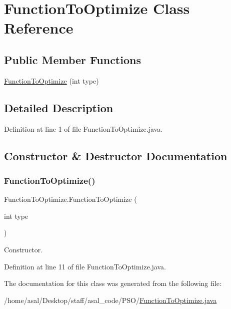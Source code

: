 \hypertarget{class_function_to_optimize}{}\section{Function\+To\+Optimize Class Reference}
\label{class_function_to_optimize}
\subsection*{Public Member Functions}
\begin{DoxyCompactItemize}
\item 
\hyperlink{class_function_to_optimize_ac98c69a430ad4270a84a9f17e48aaf0e}{Function\+To\+Optimize} (int type)
\end{DoxyCompactItemize}


\subsection{Detailed Description}


Definition at line 1 of file Function\+To\+Optimize.\+java.



\subsection{Constructor \& Destructor Documentation}
\mbox{\label{class_function_to_optimize_ac98c69a430ad4270a84a9f17e48aaf0e}} 
\subsubsection{\texorpdfstring{Function\+To\+Optimize()}{FunctionToOptimize()}}
{\footnotesize\ttfamily Function\+To\+Optimize.\+Function\+To\+Optimize (\begin{DoxyParamCaption}\item[{int}]{type }\end{DoxyParamCaption})}

Constructor. 

Definition at line 11 of file Function\+To\+Optimize.\+java.



The documentation for this class was generated from the following file\+:\begin{DoxyCompactItemize}
\item 
/home/asal/\+Desktop/staff/asal\+\_\+code/\+P\+S\+O/\hyperlink{_function_to_optimize_8java}{Function\+To\+Optimize.\+java}\end{DoxyCompactItemize}

